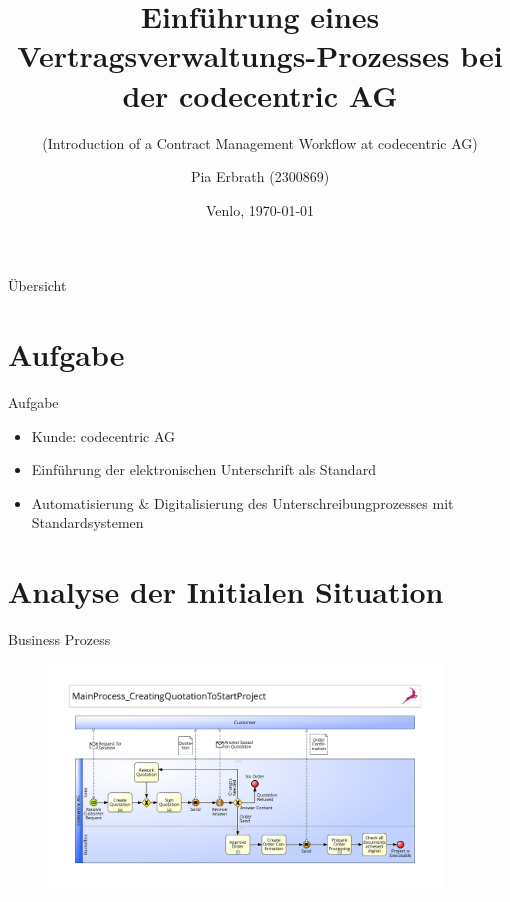 \documentclass[utf8, xcolor, usenames,dvipsnames, aspectratio=169, notes, ]{beamer}
\title
  [Vertragsverwaltungs-Prozess]{Einführung eines Vertragsverwaltungs-Prozesses \centering bei der codecentric AG}
\subtitle{(Introduction of a Contract Management Workflow
  	at codecentric AG)}
\author
  [Pia Erbrath]
  {Pia Erbrath (2300869)}
\date
  {Venlo, \today}
\institute
  {FHTenL Venlo}
\begin{document}
\maketitle

\begin{frame}{Übersicht}

  \tableofcontents

\end{frame}

\section{Aufgabe}
\begin{frame}{Aufgabe}
	\begin{itemize}
		\item Kunde: codecentric AG
		\item Einführung der elektronischen Unterschrift als Standard
		\item Automatisierung \& Digitalisierung des Unterschreibungprozesses \newline mit Standardsystemen 
	\end{itemize}
\end{frame}

\section{Analyse der Initialen Situation}
\begin{frame}{Business Prozess}
	\begin{figure}
		\centering
		\colorbox{white}{\includegraphics[width=0.93\textwidth, height=0.78\textheight]{./images/0_main}}
	\end{figure}
\end{frame}
\end{document}
